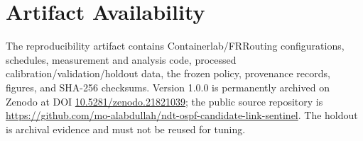 \newpage
\section{Artifact Availability}

The reproducibility artifact contains Containerlab/FRRouting configurations, schedules, measurement and analysis code, processed calibration/validation/holdout data, the frozen policy, provenance records, figures, and SHA-256 checksums. Version 1.0.0 is permanently archived on Zenodo at DOI \href{https://doi.org/10.5281/zenodo.21821039}{10.5281/zenodo.21821039}; the public source repository is \url{https://github.com/mo-alabdullah/ndt-ospf-candidate-link-sentinel}. The holdout is archival evidence and must not be reused for tuning.

